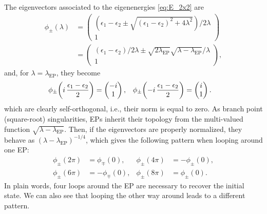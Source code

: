 \documentclass[11pt,a4paper]{article}
\begin{document}
The eigenvectors associated to the eigenenergies \eqref{eq:E_2x2} are
\begin{equation}\label{eq:phi_2x2}
\begin{split}
	\phi_{\pm}(\lambda)
	& = 
	\begin{pmatrix}
		(\epsilon_1 - \epsilon_2 \pm \sqrt{(\epsilon_1 - \epsilon_2)^2 + 4\lambda^2})/2\lambda 
		\\ 
		1
	\end{pmatrix}
	\\
	& =
	\begin{pmatrix}
		(\epsilon_1-\epsilon_2)/2\lambda \pm \sqrt{2\lambda_\text{EP}} \sqrt{\lambda - \lambda_\text{EP}}/\lambda 
		\\ 
		1
	\end{pmatrix},
\end{split}
\end{equation}
and, for $\lambda=\lambda_\text{EP}$, they become
\begin{align}
	\phi_{\pm}\qty(i\,\frac{\epsilon_1 - \epsilon_2}{2}) & = \begin{pmatrix} -i \\ 1\end{pmatrix},
	&
	\phi_{\pm}\qty(-i\,\frac{\epsilon_1 - \epsilon_2}{2}) & = \begin{pmatrix} i \\ 1\end{pmatrix}.
\end{align}
which are clearly self-orthogonal, i.e., their norm is equal to zero. 
As branch point (square-root) singularities, EPs inherit their topology from the multi-valued function $\sqrt{\lambda - \lambda_\text{EP}}$. 
Then, if the eigenvectors are properly normalized, they behave as $(\lambda - \lambda_\text{EP})^{-1/4}$, which gives the following pattern when looping around one EP:
\begin{align}
	\phi_{\pm}(2\pi) & = \phi_{\mp}(0),
	&
	\phi_{\pm}(4\pi) & = -\phi_{\pm}(0), 
	\\
	\phi_{\pm}(6\pi) & = -\phi_{\mp}(0),
	&
	\phi_{\pm}(8\pi) & = \phi_{\pm}(0).
\end{align}
In plain words, four loops around the EP are necessary to recover the initial state. 
We can also see that looping the other way around leads to a different pattern.
\end{document}
